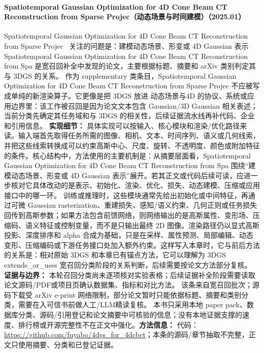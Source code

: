 \paragraph{Spatiotemporal Gaussian Optimization for 4D Cone Beam CT Reconstruction from Sparse Projec（动态场景与时间建模）（2025.01）}
Spatiotemporal Gaussian Optimization for 4D Cone Beam CT Reconstruction from Sparse Projec~\cite{2501_04140} 关注的问题是：建模动态场景、形变或 4D Gaussian 表示 Spatiotemporal Gaussian Optimization for 4D Cone Beam CT Reconstruction from Spa 是宽召回补全中发现的论文，主要根据标题、摘要和 arXiv 类别判定其与 3DGS 的关系。
作为 supplementary 类条目，Spatiotemporal Gaussian Optimization for 4D Cone Beam CT Reconstruction from Sparse Projec 不应被写成单纯的新渲染算子。它更像是把 3DGS 放进 动态场景与4D 的协议、系统或应用边界里：该工作被召回是因为论文文本包含 Gaussian/3D Gaussian 相关表述；当前分类先确定其任务域和与 3DGS 的相关性，后续证据流水线再补代码、企业和引用信息。
\textbf{实现细节：} 具体实现可以按输入、核心模块和渲染/优化路径来读。输入端首先取得任务所需的图像、相机、文本、时间序列、语义或几何线索，并把这些线索转换成可以约束高斯中心、尺度、旋转、不透明度、颜色或附加特征的条件。核心结构中，方法使用的主要机制是：从摘要层面看，Spatiotemporal Gaussian Optimization for 4D Cone Beam CT Reconstruction from Spa 围绕“建模动态场景、形变或 4D Gaussian 表示”展开。若其正文或代码后续可读，应进一步核对它具体改动的是表示、初始化、渲染、优化、损失、动态建模、压缩或应用接口中的哪一环。 训练或推理时，这些模块通常先给出初始化或中间特征，再通过可微 Gaussian rasterization、重建损失、感知/语义约束、几何正则或任务损失回传到高斯参数；如果方法包含前馈网络，则网络输出的是高斯属性、变形场、压缩码、语义特征或控制变量，而不是只输出最终 2D 图像。渲染路径仍以显式高斯投影、深度排序和 alpha 合成为基础，只是在采样、属性预测、局部编辑、动态变形、压缩编码或下游任务接口处加入额外约束。这样写入本章时，它与前后方法的关系是：相对原始 3DGS 和本章已有锚点方法，它可以理解为 3DGS extends\_or\_uses 宽召回分类阶段的关系判断，后续需要按论文方法部分复核。
\textbf{证据与边界：} 本轮召回分类尚未逐项核对实验表格；后续证据补全阶段需要读取论文源码/PDF或项目页确认数据集、指标和对比方法。 该条来自宽召回批次；源码下载受 arXiv e-print 网络限制，部分论文暂时只能依据标题、摘要和类别分类，需要在入可信书前做人工/LLM精读复核。 本书只采用本地 paper pack、数据库分类、源码/引用登记和论文摘要中可核验的信息；没有本地证据支撑的速度、排行榜或开源完整性不在正文中强化。\textbf{方法信息：} 代码：\url{https://github.com/fuyabo/4dgs\_for\_4dcbct}；本条的源码/章节抽取不完整，正文只使用摘要、分类和已登记证据。
